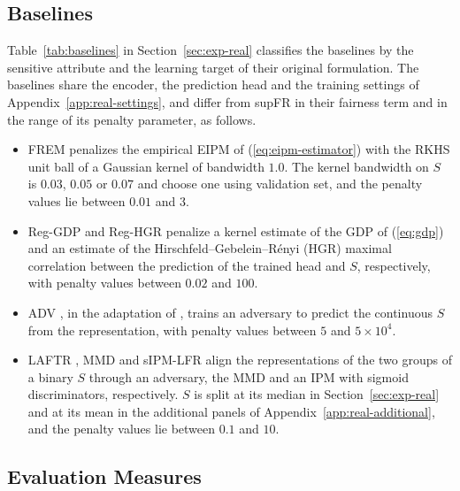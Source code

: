 \documentclass{article} %
\begin{document}
\subsection{Baselines}
\label{app:real-baselines}

Table~\ref{tab:baselines} in Section~\ref{sec:exp-real} classifies the baselines by the sensitive attribute and the learning target of their original formulation.  The baselines share the encoder, the prediction head and the training settings of Appendix~\ref{app:real-settings}, and differ from supFR in their fairness term and in the range of its penalty parameter, as follows.
\begin{itemize}
  \item FREM \citep{kong2025fair} penalizes the empirical EIPM of (\ref{eq:eipm-estimator}) with the RKHS unit ball of a Gaussian kernel of bandwidth $1.0$.  The kernel bandwidth on $S$ is $0.03$, $0.05$ or $0.07$ and choose one using validation set, and the penalty values lie between $0.01$ and $3$.
  \item Reg-GDP \citep{jiang2022generalized} and Reg-HGR \citep{mary2019fairness} penalize a kernel estimate of the GDP of (\ref{eq:gdp}) and an estimate of the Hirschfeld--Gebelein--R\'enyi (HGR) maximal correlation between the prediction of the trained head and $S$, respectively, with penalty values between $0.02$ and $100$.
  \item ADV \citep{zhang2018mitigating}, in the adaptation of \citet{kong2025fair}, trains an adversary to predict the continuous $S$ from the representation, with penalty values between $5$ and $5\times10^{4}$.
  \item LAFTR \citep{madras2018learning}, MMD \citep{deka2023mmd} and sIPM-LFR \citep{kim2022learning} align the representations of the two groups of a binary $S$ through an adversary, the MMD and an IPM with sigmoid discriminators, respectively.  $S$ is split at its median in Section~\ref{sec:exp-real} and at its mean in the additional panels of Appendix~\ref{app:real-additional}, and the penalty values lie between $0.1$ and $10$.
\end{itemize}

\subsection{Evaluation Measures}
\label{app:worst-case}
\end{document}
